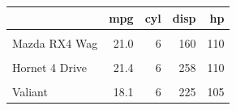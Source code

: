 \documentclass{article}
\begin{document}
\thispagestyle{empty}

\begin{table}
\centering
\begin{tabular}{lrrrr}
\toprule
\textbf{ } & \textbf{mpg} & \textbf{cyl} & \textbf{disp} & \textbf{hp}\\
\midrule
\cellcolor{blue!10}{Mazda RX4} & \cellcolor{blue!10}{21.0} & \cellcolor{blue!10}{6} & \cellcolor{blue!10}{160} & \cellcolor{blue!10}{110}\\
Mazda RX4 Wag & 21.0 & 6 & 160 & 110\\
\cellcolor{blue!10}{Datsun 710} & \cellcolor{blue!10}{22.8} & \cellcolor{blue!10}{4} & \cellcolor{blue!10}{108} & \cellcolor{blue!10}{93}\\
Hornet 4 Drive & 21.4 & 6 & 258 & 110\\
\cellcolor{blue!10}{Hornet Sportabout} & \cellcolor{blue!10}{18.7} & \cellcolor{blue!10}{8} & \cellcolor{blue!10}{360} & \cellcolor{blue!10}{175}\\
\addlinespace
Valiant & 18.1 & 6 & 225 & 105\\
\bottomrule
\end{tabular}
\end{table}
\end{document}

